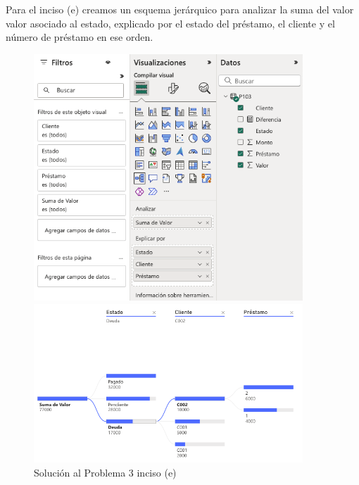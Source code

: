 \documentclass{article}
\begin{document}
\noindent
Para el inciso (e) creamos un esquema jerárquico para analizar la suma del valor valor asociado al estado, explicado por el estado del préstamo, el cliente y el número de préstamo en ese orden.
\begin{figure}[!h]
    \centering
    \begin{minipage}{\textwidth}
        \centering
        \includegraphics[width=0.9\textwidth]{figures/s103e-1.png}
    \end{minipage}
    \hfill
    \begin{minipage}{\textwidth}
        \centering
        \includegraphics[width=0.9\textwidth]{figures/s103e-2.png}
    \end{minipage}
    \captionsetup{width=0.9\textwidth}
    \caption{Solución al Problema 3 inciso (e)}
    \label{fig:s103e}
\end{figure}
\end{document}
